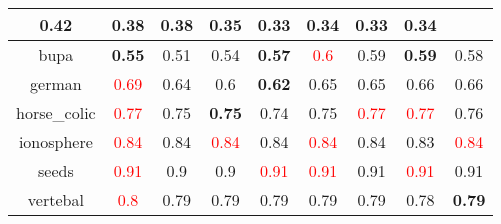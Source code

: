\documentclass{article}%
\begin{document}
\begin{tabular}{c|cccccccc}
{0.42
}&0.38&\textbf{0.38}&0.35&0.33&\textbf{0.34}&0.33&\textbf{0.34}\\%
\hline%
bupa&\textbf{0.55}&0.51&0.54&\textbf{0.57}&\textcolor{red}{ 
0.6
}&0.59&\textbf{0.59}&0.58\\%
\hline%
german&\textcolor{red}{ 
0.69
}&0.64&0.6&\textbf{0.62}&0.65&0.65&0.66&0.66\\%
\hline%
horse\_colic&\textcolor{red}{ 
0.77
}&0.75&\textbf{0.75}&0.74&0.75&\textcolor{red}{ 
0.77
}&\textcolor{red}{ 
0.77
}&0.76\\%
\hline%
ionosphere&\textcolor{red}{ 
0.84
}&0.84&\textcolor{red}{ 
0.84
}&0.84&\textcolor{red}{ 
0.84
}&0.84&0.83&\textcolor{red}{ 
0.84
}\\%
\hline%
seeds&\textcolor{red}{ 
0.91
}&0.9&0.9&\textcolor{red}{ 
0.91
}&\textcolor{red}{ 
0.91
}&0.91&\textcolor{red}{ 
0.91
}&0.91\\%
\hline%
vertebal&\textcolor{red}{ 
0.8
}&0.79&0.79&0.79&0.79&0.79&0.78&\textbf{0.79}\\%
\hline%
\end{tabular}

%
\end{document}
